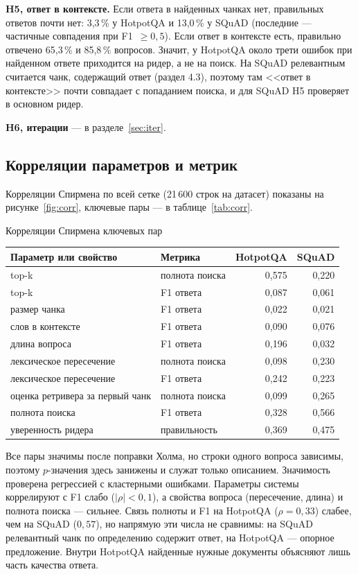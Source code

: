 \textbf{H5, ответ в контексте.} Если ответа в найденных чанках нет, правильных ответов почти нет: 3,3\,\% у HotpotQA и 13,0\,\% у SQuAD (последние --- частичные совпадения при F1~$\ge 0{,}5$). Если ответ в контексте есть, правильно отвечено 65,3\,\% и 85,8\,\% вопросов. Значит, у HotpotQA около трети ошибок при найденном ответе приходится на ридер, а не на поиск. На SQuAD релевантным считается чанк, содержащий ответ (раздел 4.3), поэтому там <<ответ в контексте>> почти совпадает с попаданием поиска, и для SQuAD H5 проверяет в основном ридер.

\textbf{H6, итерации} --- в разделе~\ref{sec:iter}.

\subsection{Корреляции параметров и метрик}

Корреляции Спирмена по всей сетке (21\,600 строк на датасет) показаны на рисунке~\ref{fig:corr}, ключевые пары --- в таблице~\ref{tab:corr}.

\begin{gosttable}{Корреляции Спирмена ключевых пар}\label{tab:corr}
\begin{tabular}{llrr}
\toprule
Параметр или свойство & Метрика & HotpotQA & SQuAD \\
\midrule
top-k & полнота поиска & 0,575 & 0,220 \\
top-k & F1 ответа & 0,087 & 0,061 \\
размер чанка & F1 ответа & 0,022 & 0,021 \\
слов в контексте & F1 ответа & 0,090 & 0,076 \\
длина вопроса & F1 ответа & 0,196 & 0,032 \\
лексическое пересечение & полнота поиска & 0,098 & 0,230 \\
лексическое пересечение & F1 ответа & 0,242 & 0,223 \\
оценка ретривера за первый чанк\footnotemark & полнота поиска & 0,099 & 0,265 \\
полнота поиска & F1 ответа & 0,328 & 0,566 \\
уверенность ридера & правильность & 0,369 & 0,475 \\
\bottomrule
\end{tabular}
\end{gosttable}

Все пары значимы после поправки Холма, но строки одного вопроса зависимы, поэтому $p$-значения здесь занижены и служат только описанием. Значимость проверена регрессией с кластерными ошибками. Параметры системы коррелируют с F1 слабо ($|\rho| < 0{,}1$), а свойства вопроса (пересечение, длина) и полнота поиска --- сильнее. Связь полноты и F1 на HotpotQA ($\rho = 0{,}33$) слабее, чем на SQuAD ($0{,}57$), но напрямую эти числа не сравнимы: на SQuAD релевантный чанк по определению содержит ответ, на HotpotQA --- опорное предложение. Внутри HotpotQA найденные нужные документы объясняют лишь часть качества ответа.


